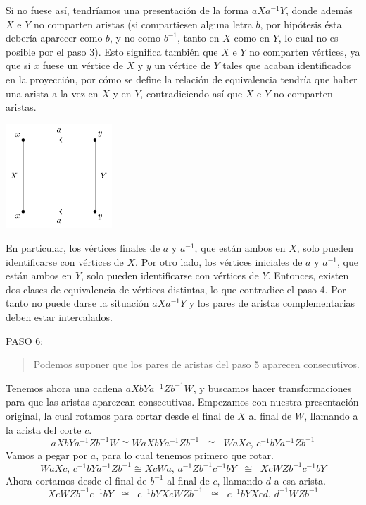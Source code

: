 {    \noindent
    Si no fuese así, tendríamos una presentación de la forma $aXa^{-1}Y$, donde además $X$ e $Y$ no comparten aristas 
    (si compartiesen alguna letra $b$, por hipótesis ésta debería aparecer como $b$, y no como $b^{-1}$, tanto en $X$ como en $Y$, 
    lo cual no es posible por el paso 3). 
    Esto significa también que $X$ e $Y$ no comparten vértices, ya que si $x$ fuese un vértice de $X$ y $y$ un vértice de $Y$ tales que acaban identificados en la proyección,
    por cómo se define la relación de equivalencia tendría que haber una arista a la vez en $X$ y en $Y$, contradiciendo así que $X$ e $Y$ no comparten aristas.

    \begin{center}
        \includegraphics[width=0.3\textwidth]{img/teorema-clasificacion/paso5.pdf}
    \end{center}

    \vspace{0.5em}
    \noindent
    En particular, los vértices finales de $a$ y $a^{-1}$, que están ambos en $X$, 
    solo pueden identificarse con vértices de $X$. 
    Por otro lado, los vértices iniciales de $a$ y $a^{-1}$, que están ambos en $Y$, 
    solo pueden identificarse con vértices de $Y$. 
    Entonces, existen dos clases de equivalencia de vértices distintas, 
    lo que contradice el paso 4. Por tanto no puede darse la situación $aXa^{-1}Y$ y los pares de aristas complementarias deben estar intercalados.

    \vspace{1.3em}
    \noindent
    \underline{PASO 6:}
    \begin{quote}
        Podemos suponer que los pares de aristas del paso 5 aparecen consecutivos.
    \end{quote}

    \noindent
    Tenemos ahora una cadena $aXbYa^{-1}Zb^{-1}W$, 
    y buscamos hacer transformaciones para que las aristas aparezcan consecutivas. 
    Empezamos con nuestra presentación original, la cual rotamos para cortar desde el final de $X$ al final de $W$, llamando a la arista del corte $c$. 
    \[
        aXbYa^{-1}Zb^{-1}W \cong WaXbYa^{-1}Zb^{-1} \;\;\cong\;\; WaXc \text{, } c^{-1}bYa^{-1}Zb^{-1}
    \]
    \noindent 
    Vamos a pegar por $a$, para lo cual tenemos primero que rotar.
    \[
        WaXc \text{, } c^{-1}bYa^{-1}Zb^{-1} \cong XcWa \text{, } a^{-1}Zb^{-1}c^{-1}bY \;\;\cong\;\; XcWZb^{-1}c^{-1}bY
    \] 
    \noindent
    Ahora cortamos desde el final de $b^{-1}$ al final de $c$, llamando $d$ a esa arista. 
    \[
        XcWZb^{-1}c^{-1}bY \;\;\cong\;\; c^{-1}bYXcWZb^{-1} \;\;\cong\;\; c^{-1}bYXcd \text{, } d^{-1}WZb^{-1}
    \]

}
